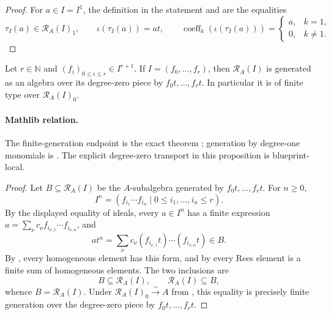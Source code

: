 \begin{proof}
  \leanok
  For $a\in I=I^1$, the definition in the statement and
   are the equalities
  \[
    \tau_I(a)\in\mathcal R_A(I)_1,
    \qquad
    \iota(\tau_I(a))=at,
    \qquad
    \operatorname{coeff}_k(\iota(\tau_I(a)))
      =\begin{cases}a,&k=1,\\0,&k\ne1.
        \end{cases}
  \]
\end{proof}

\begin{proposition}
  \label{prop:nagata-rees-finite-generation}
  \lean{}

  Let $r\in\mathbb N$ and $(f_i)_{0\leq i\leq r}\in I^{r+1}$.  If
  $I=(f_0,\ldots,f_r)$, then $\mathcal R_A(I)$ is generated as an algebra
  over its degree-zero piece by $f_0t,\ldots,f_rt$.  In particular it is of
  finite type over $\mathcal R_A(I)_0$.

  \paragraph{Mathlib relation.}
  The finite-generation endpoint is the exact theorem
  \texttt{}; generation by degree-one monomials
  is \texttt{}.  The explicit
  degree-zero transport in this proposition is blueprint-local.
\end{proposition}

\begin{proof}
  Let $B\subseteq\mathcal R_A(I)$ be the $A$-subalgebra generated by
  $f_0t,\ldots,f_rt$.  For $n\ge0$,
  \[
    I^n=(f_{i_1}\cdots f_{i_n}\mid
       0\le i_1,\ldots,i_n\le r).
  \]
  By the displayed equality of ideals, every $a\in I^n$ has a finite
  expression
  $a=\sum_\nu c_\nu f_{i_{\nu,1}}\cdots f_{i_{\nu,n}}$, and
  \[
    at^n
      =\sum_\nu c_\nu
        (f_{i_{\nu,1}}t)\cdots(f_{i_{\nu,n}}t)\in B.
  \]
  By , every homogeneous element has
  this form, and by  every Rees
  element is a finite sum of homogeneous elements.  The two inclusions are
  \[
    B\subseteq\mathcal R_A(I),\qquad
    \mathcal R_A(I)\subseteq B,
  \]
  whence $B=\mathcal R_A(I)$.  Under
  $\mathcal R_A(I)_0\xrightarrow{\sim}A$ from
  , this equality is precisely finite
  generation over the degree-zero piece by $f_0t,\ldots,f_rt$.
\end{proof}

